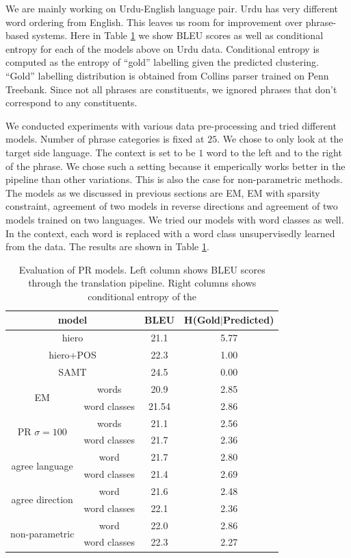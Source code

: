 We are mainly working on Urdu-English language pair. 
Urdu has very 
different word ordering from English. 
This leaves us room for improvement over
phrase-based systems.
Here in Table \ref{tab:results} 
we show BLEU scores as well as
conditional entropy for each of the models above
on Urdu data. Conditional entropy is computed
as the entropy of ``gold'' labelling given
the predicted clustering. ``Gold'' labelling
distribution
is obtained from Collins parser
trained on Penn Treebank. Since not
all phrases are constituents, we ignored
phrases that don't correspond to any constituents.

We conducted experiments with various data pre-processing
and tried different models. Number of phrase categories
is fixed at $25$. We chose to only look at
the target side language. The context is set
to be $1$ word to the left and to the right of the phrase.
We chose such a setting because it emperically works better
in the pipeline than other variations. This is also
the case for non-parametric methods. The models as we discussed
in previous sections are EM, EM with sparsity constraint, 
agreement of two models in reverse directions and agreement
of two models trained on two languages. We tried our models
with word classes as well. In the context, each word is
replaced with a word class unsupervisedly learned from the data.
The results are shown in Table \ref{tab:results}.

\begin{table}[h]
  \centering
  \begin{tabular}{ |*{4}{c|} }
    \hline
    \multicolumn{2}{|c|}{model} & BLEU & H(Gold$|$Predicted)\\
    \hline
    \multicolumn{2}{|c|}{hiero} & 21.1 & 5.77\\
    \multicolumn{2}{|c|}{hiero+POS} & 22.3 & 1.00 \\
    \multicolumn{2}{|c|}{SAMT} & 24.5 & 0.00 \\
    \hline
	\multirow{2}{*}{EM} & words & 20.9 & 2.85 \\
	& word classes & 21.54 & 2.86 \\ \hline
    \multirow{2}{*}{PR $\sigma=100$}&words & 21.1 & 2.56 \\
	&word classes & 21.7 & 2.36 \\ \hline
    \multirow{2}{*}{agree language}&word & 21.7 & 2.80 \\
	&word classes & 21.4 & 2.69\\ \hline
    \multirow{2}{*}{agree direction}&word & 21.6 & 2.48\\
	&word classes &22.1 &2.36 \\ \hline
   \multirow{2}{*}{non-parametric}&word & 22.0 & 2.86\\
	& word classes&22.3&2.27\\ 
    \hline
  \end{tabular}
    \caption
  {Evaluation of PR models.
	Left column shows BLEU scores
	through the translation pipeline.
	Right columns shows conditional entropy
	of the 
    }
  \label{tab:results}
\end{table}

